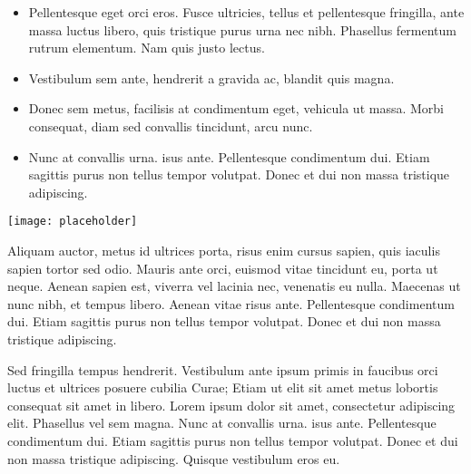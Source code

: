 \documentclass[landscape,a0paper,fontscale=0.285]{baposter} %
\newcommand{\compresslist}{ %
\setlength{\itemsep}{1pt}
\setlength{\parskip}{0pt}
\setlength{\parsep}{0pt}
}
\begin{document}
\begin{poster}
{\begin{multicols}{2}

\begin{itemize}\compresslist
\item Pellentesque eget orci eros. Fusce ultricies, tellus et pellentesque fringilla, ante massa luctus libero, quis tristique purus urna nec nibh. Phasellus fermentum rutrum elementum. Nam quis justo lectus.
\item Vestibulum sem ante, hendrerit a gravida ac, blandit quis magna.
\item Donec sem metus, facilisis at condimentum eget, vehicula ut massa. Morbi consequat, diam sed convallis tincidunt, arcu nunc.
\item Nunc at convallis urna. isus ante. Pellentesque condimentum dui. Etiam sagittis purus non tellus tempor volutpat. Donec et dui non massa tristique adipiscing.
\end{itemize}

\end{multicols}
}


{
\begin{multicols}{2}
\vspace{1em}
\begin{center}
\texttt{[image: placeholder]}
\end{center}

Aliquam auctor, metus id ultrices porta, risus enim cursus sapien, quis iaculis sapien tortor sed odio. Mauris ante orci, euismod vitae tincidunt eu, porta ut neque. Aenean sapien est, viverra vel lacinia nec, venenatis eu nulla. Maecenas ut nunc nibh, et tempus libero. Aenean vitae risus ante. Pellentesque condimentum dui. Etiam sagittis purus non tellus tempor volutpat. Donec et dui non massa tristique adipiscing.
\end{multicols}


\begin{multicols}{2}
\vspace{1em}
Sed fringilla tempus hendrerit. Vestibulum ante ipsum primis in faucibus orci luctus et ultrices posuere cubilia Curae; Etiam ut elit sit amet metus lobortis consequat sit amet in libero. Lorem ipsum dolor sit amet, consectetur adipiscing elit. Phasellus vel sem magna. Nunc at convallis urna. isus ante. Pellentesque condimentum dui. Etiam sagittis purus non tellus tempor volutpat. Donec et dui non massa tristique adipiscing. Quisque vestibulum eros eu.


\end{multicols}}
\end{poster}
\end{document}
